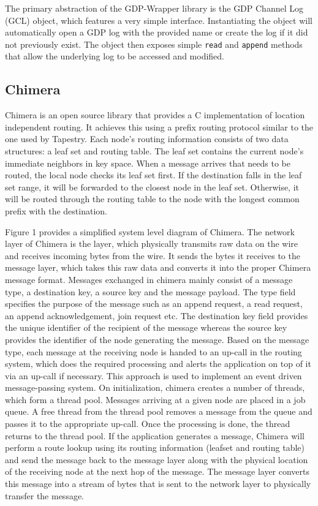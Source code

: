 The primary abstraction of the GDP-Wrapper library is the GDP Channel Log (GCL) object, which features a very simple interface. Instantiating the object will automatically open a GDP log with the provided name or create the log if it did not previously exist. The object then exposes simple \texttt{read} and \texttt{append} methods that allow the underlying log to be accessed and modified.

\subsection{Chimera}
Chimera is an open source library that provides a C implementation of location independent routing. It achieves this using a prefix routing protocol similar to the one used by Tapestry.  Each node's routing information consists of two data structures: a leaf set and routing table. The leaf set contains the current node's immediate neighbors in key space. When a message arrives that needs to be routed, the local node checks its leaf set first. If the destination falls in the leaf set range, it will be forwarded to the closest node in the leaf set. Otherwise, it will be routed through the routing table to the node with the longest common prefix with the destination.
 
Figure 1 provides a simplified system level diagram of Chimera. The network layer of Chimera is the layer, which physically transmits raw data on the wire and receives incoming bytes from the wire. It sends the bytes it receives to the message layer, which takes this raw data and converts it into the proper Chimera message format. Messages exchanged in chimera mainly consist of a message type, a destination key, a source key and the message payload. The type field specifies the purpose of the message such as an append request, a read request, an append acknowledgement, join request etc. The destination key field provides the unique identifier of the recipient of the message whereas the source key provides the identifier of the node generating the message. Based on the message type, each message at the receiving node is handed to an up-call in the routing system, which does the required processing and alerts the application on top of it via an up-call if necessary. This approach is used to implement an event driven message-passing system. On initialization, chimera creates a number of threads, which form a thread pool. Messages arriving at a given node are placed in a job queue. A free thread from the thread pool removes a message from the queue and passes it to the appropriate up-call. Once the processing is done, the thread returns to the thread pool. If the application generates a message, Chimera will perform a route lookup using its routing information (leafset and routing table) and send the message back to the message layer along with the physical location of the receiving node at the next hop of the message. The message layer converts this message into a stream of bytes that is sent to the network layer to physically transfer the message.
 
